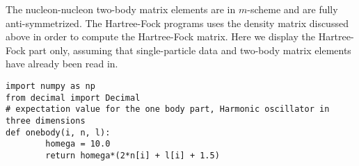 \documentclass[%
oneside,                 %
final,                   %
10pt]{article}
\newenvironment{doconceexercise}{}{}
\begin{document}
\begin{doconceexercise}
The nucleon-nucleon two-body matrix elements are in $m$-scheme and are fully anti-symmetrized. The Hartree-Fock programs uses the density matrix discussed above in order to compute the Hartree-Fock matrix.
Here we display the Hartree-Fock part only, assuming that single-particle data and two-body matrix elements have already been read in. 





































































































\begin{verbatim}
import numpy as np 
from decimal import Decimal
# expectation value for the one body part, Harmonic oscillator in three dimensions
def onebody(i, n, l):
        homega = 10.0
        return homega*(2*n[i] + l[i] + 1.5)


\end{verbatim}
\end{doconceexercise}
\end{document}
